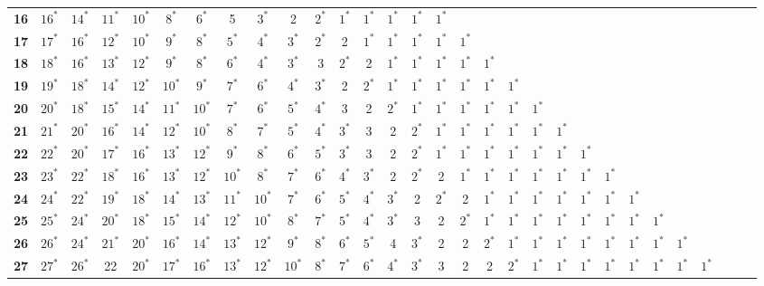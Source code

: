 \begin{sidewaystable}
\begin{tabular}{|c| c c c c c c c c c c c c c c c c c c c c c c c c c c c c c |}
\textbf{16} & $16^*$ & $14^*$ & $11^*$ & $10^*$ & $8^*$ & $6^*$ & 5 & $3^*$ & 2 & $2^*$ & $1^*$ & $1^*$ & $1^*$ & $1^*$ & $1^*$ & & & & & & & & & & & & & & \\
\textbf{17} & $17^*$ & $16^*$ & $12^*$ & $10^*$ & $9^*$ & $8^*$ & $5^*$ & $4^*$ & $3^*$ & $2^*$ & 2 & $1^*$ & $1^*$ & $1^*$ & $1^*$ & $1^*$ & & & & & & & & & & & & & \\
\textbf{18} & $18^*$ & $16^*$ & $13^*$ & $12^*$ & $9^*$ & $8^*$ & $6^*$ & $4^*$ & $3^*$ & 3 & $2^*$ & 2 & $1^*$ & $1^*$ & $1^*$ & $1^*$ & $1^*$ & & & & & & & & & & & & \\
\textbf{19} & $19^*$ & $18^*$ & $14^*$ & $12^*$ & $10^*$ & $9^*$ & $7^*$ & $6^*$ & $4^*$ & $3^*$ & 2 & $2^*$ & $1^*$ & $1^*$ & $1^*$ & $1^*$ & $1^*$ & $1^*$ & & & & & & & & & & & \\
\textbf{20} & $20^*$ & $18^*$ & $15^*$ & $14^*$ & $11^*$ & $10^*$ & $7^*$ & $6^*$ & $5^*$ & $4^*$ & 3 & 2 & $2^*$ & $1^*$ & $1^*$ & $1^*$ & $1^*$ & $1^*$ & $1^*$ & & & & & & & & & & \\
\textbf{21} & $21^*$ & $20^*$ & $16^*$ & $14^*$ & $12^*$ & $10^*$ & $8^*$ & $7^*$ & $5^*$ & $4^*$ & $3^*$ & 3 & 2 & $2^*$ & $1^*$ & $1^*$ & $1^*$ & $1^*$ & $1^*$ & $1^*$ & & & & & & & & & \\
\textbf{22} & $22^*$ & $20^*$ & $17^*$ & $16^*$ & $13^*$ & $12^*$ & $9^*$ & $8^*$ & $6^*$ & $5^*$ & $3^*$ & 3 & 2 & $2^*$ & $1^*$ & $1^*$ & $1^*$ & $1^*$ & $1^*$ & $1^*$ & $1^*$ & & & & & & & & \\
\textbf{23} & $23^*$ & $22^*$ & $18^*$ & $16^*$ & $13^*$ & $12^*$ & $10^*$ & $8^*$ & $7^*$ & $6^*$ & $4^*$ & $3^*$ & 2 & $2^*$ & 2 & $1^*$ & $1^*$ & $1^*$ & $1^*$ & $1^*$ & $1^*$ & $1^*$ & & & & & & & \\
\textbf{24} & $24^*$ & $22^*$ & $19^*$ & $18^*$ & $14^*$ & $13^*$ & $11^*$ & $10^*$ & $7^*$ & $6^*$ & $5^*$ & $4^*$ & $3^*$ & 2 & $2^*$ & 2 & $1^*$ & $1^*$ & $1^*$ & $1^*$ & $1^*$ & $1^*$ & $1^*$ & & & & & & \\
\textbf{25} & $25^*$ & $24^*$ & $20^*$ & $18^*$ & $15^*$ & $14^*$ & $12^*$ & $10^*$ & $8^*$ & $7^*$ & $5^*$ & $4^*$ & $3^*$ & 3 & 2 & $2^*$ & $1^*$ & $1^*$ & $1^*$ & $1^*$ & $1^*$ & $1^*$ & $1^*$ & $1^*$ & & & & & \\
\textbf{26} & $26^*$ & $24^*$ & $21^*$ & $20^*$ & $16^*$ & $14^*$ & $13^*$ & $12^*$ & $9^*$ & $8^*$ & $6^*$ & $5^*$ & 4 & $3^*$ & 2 & 2 & $2^*$ & $1^*$ & $1^*$ & $1^*$ & $1^*$ & $1^*$ & $1^*$ & $1^*$ & $1^*$ & & & & \\
\textbf{27} & $27^*$ & $26^*$ & 22 & $20^*$ & $17^*$ & $16^*$ & $13^*$ & $12^*$ & $10^*$ & $8^*$ & $7^*$ & $6^*$ & $4^*$ & $3^*$ & 3 & 2 & 2 & $2^*$ & $1^*$ & $1^*$ & $1^*$ & $1^*$ & $1^*$ & $1^*$ & $1^*$ & $1^*$ & & & \\

\end{tabular}
\end{sidewaystable}
